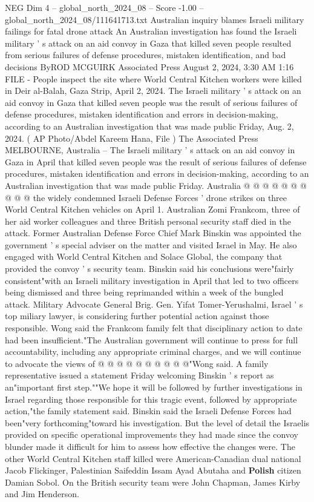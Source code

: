 \begin{textsample}{NEG Dim 4 – global\_north\_2024\_08 – Score -1.00 – global\_north\_2024\_08/111641713.txt}  \label{ex:f4_neg_291}
Australian inquiry blames Israeli military failings for fatal drone attack An Australian investigation has found the Israeli military ' s attack on an aid convoy in Gaza that killed seven people resulted from serious failures of defense procedures, mistaken identification, and bad decisions ByROD MCGUIRK Associated Press August 2, 2024, 3:30 AM 1:16 FILE - People inspect the site where World Central Kitchen workers were killed in Deir al-Balah, Gaza Strip, April 2, 2024.
The Israeli military ' s attack on an aid convoy in Gaza that killed seven people was the result of serious failures of defense procedures, mistaken identification and errors in decision-making, according to an Australian investigation that was made public Friday, Aug. 2, 2024. ( AP Photo/Abdel Kareem Hana, File ) The Associated Press MELBOURNE, Australia -- The Israeli military ' s attack on an aid convoy in Gaza in April that killed seven people was the result of serious failures of defense procedures, mistaken identification and errors in decision-making, according to an Australian investigation that was made public Friday.
Australia @ @ @ @ @ @ @ @ @ @ the widely condemned Israeli Defense Forces ' drone strikes on three World Central Kitchen vehicles on April 1.
Australian Zomi Frankcom, three of her aid worker colleagues and three British personal security staff died in the attack.
Former Australian Defense Force Chief Mark Binskin was appointed the government ' s special adviser on the matter and visited Israel in May.
He also engaged with World Central Kitchen and Solace Global, the company that provided the convoy ' s security team.
Binskin said his conclusions were"fairly consistent"with an Israeli military investigation in April that led to two officers being dismissed and three being reprimanded within a week of the bungled attack.
Military Advocate General Brig.
Gen.
Yifat Tomer-Yerushalmi, Israel ' s top miliary lawyer, is considering further potential action against those responsible.
Wong said the Frankcom family felt that disciplinary action to date had been insufficient."The Australian government will continue to press for full accountability, including any appropriate criminal charges, and we will continue to advocate the views of @ @ @ @ @ @ @ @ @ @"Wong said.
A family representative issued a statement Friday welcoming Binskin ' s report as an"important first step.""We hope it will be followed by further investigations in Israel regarding those responsible for this tragic event, followed by appropriate action,"the family statement said.
Binskin said the Israeli Defense Forces had been"very forthcoming"toward his investigation.
But the level of detail the Israelis provided on specific operational improvements they had made since the convoy blunder made it difficult for him to assess how effective the changes were.
The other World Central Kitchen staff killed were American-Canadian dual national Jacob Flickinger, Palestinian Saifeddin Issam Ayad Abutaha and \textbf{Polish} citizen Damian Sobol.
On the British security team were John Chapman, James Kirby and Jim Henderson.

\end{textsample}
